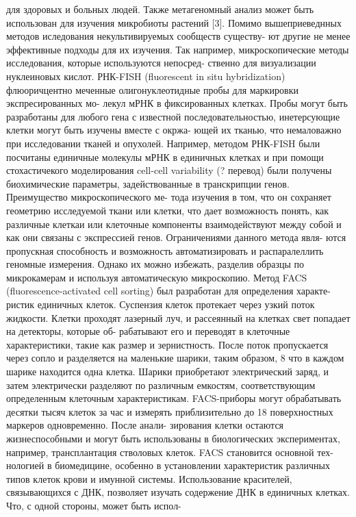 для здоровых и больных людей. Также метагеномный анализ может быть использован для
изучения микробиоты растений [3].
Помимо вышеприеведнных методов иследования некультивируемых сообществ существу-
ют другие не менее эффективные подходы для их изучения.
Так например, микроскопические методы исследования, которые используются непосред-
ственно для визуализации нуклеиновых кислот. РНК-FISH (fluorescent in situ hybridization)
флюоричцентно меченные олигонуклеотидные пробы для маркировки экспресированных мо-
лекул мРНК в фиксированных клетках. Пробы могут быть разработаны для любого гена с
известной последовательностью, инетерсующие клетки могут быть изучены вместе с окржа-
ющей их тканью, что немаловажно при исследовании тканей и опухолей. Например, методом
РНК-FISH были посчитаны единичные молекулы мРНК в единичных клетках и при помощи
стохастичекого моделирования cell-cell variability (? перевод) были получены биохимические
параметры, задействованные в транскрипции генов. Преимущество микроскопического ме-
тода изучения в том, что он сохраняет геометрию исследуемой ткани или клетки, что дает
возможность понять, как различные клеткаи или клеточные компоненты взаимодействуют
между собой и как они связаны с экспрессией генов. Ограничениями данного метода явля-
ются пропускная способность и возможность автоматизировать и распаралеллить геномные
измерения. Однако их можно избежать, разделив образцы по микрокамерам и используя
автоматическую микроскопию.
Метод FACS (fluorescence-activated cell sorting) был разработан для определения характе-
ристик единичных клеток. Суспензия клеток протекает через узкий поток жидкости. Клетки
проходят лазерный луч, и рассеянный на клетках свет попадает на детекторы, которые об-
рабатывают его и переводят в клеточные характеристики, такие как размер и зернистность.
После поток пропускается через сопло и разделяется на маленькие шарики, таким образом,
8
что в каждом шарике находится одна клетка. Шарики приобретают электрический заряд,
и затем электрически разделяют по различным емкостям, соответствующим определенным
клеточным характеристикам. FACS-приборы могут обрабатывать десятки тысяч клеток за
час и измерять приблизительно до 18 поверхностных маркеров одновременно. После анали-
зирования клетки остаются жизнеспособными и могут быть использованы в биологических
экспериментах, например, трансплантация стволовых клеток. FACS становится основной тех-
нологией в биомедицине, особенно в установлении характеристик различных типов клеток
крови и имунной системы. Использование красителей, связывающихся с ДНК, позволяет
изучать содержение ДНК в единичных клетках. Что, с одной стороны, может быть испол-

